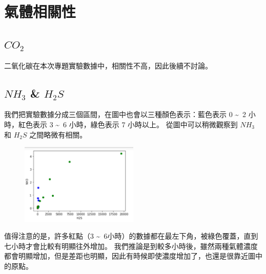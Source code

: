 \section{氣體相關性}
	\subsection{$CO_2$}
		二氧化碳在本次專題實驗數據中，相關性不高，因此後續不討論。
	\subsection{$NH_3$ \& $H_2S$}
		我們把實驗數據分成三個區間，在圖中也會以三種顏色表示：藍色表示 0 \textasciitilde \ 2 小時，紅色表示 3 \textasciitilde \ 6 小時，綠色表示 7 小時以上。
		從圖中可以稍微觀察到 $NH_3$ 和 $H_2S$ 之間略微有相關。
		\begin{figure}[H]
			\centering
			\includegraphics[width=0.5\textwidth]{pic/NH3_H2S.png}
		\end{figure}
		值得注意的是，許多紅點（3 \textasciitilde \ 6小時）的數據都在最左下角，被綠色覆蓋，直到七小時才會比較有明顯往外增加。
		我們推論是到較多小時後，雖然兩種氣體濃度都會明顯增加，但是差距也明顯，因此有時候即使濃度增加了，也還是很靠近圖中的原點。
